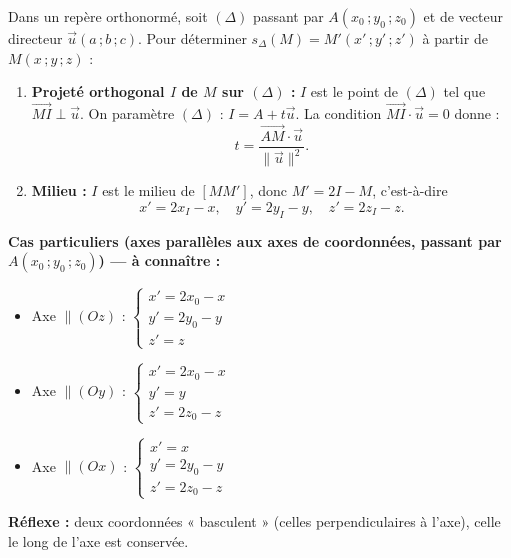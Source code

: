 \documentclass[11pt]{article}
\begin{document}
\begin{methode}
Dans un repère orthonormé, soit $(\Delta)$ passant par $A(x_{0}\,;y_{0}\,;z_{0})$ et de vecteur directeur $\vec{u}(a\,;b\,;c)$. Pour déterminer $s_{\Delta}(M)=M'(x'\,;y'\,;z')$ à partir de $M(x\,;y\,;z)$ :
\begin{enumerate}
\item \textbf{Projeté orthogonal $I$ de $M$ sur $(\Delta)$ :} $I$ est le point de $(\Delta)$ tel que $\overrightarrow{MI}\perp\vec{u}$.
On paramètre $(\Delta)$ : $I = A + t\vec{u}$. La condition $\overrightarrow{MI}\cdot\vec{u}=0$ donne :
\[t = \frac{\overrightarrow{AM}\cdot\vec{u}}{\|\vec{u}\|^{2}}.\]
\item \textbf{Milieu :} $I$ est le milieu de $[MM']$, donc $M' = 2I - M$, c'est-à-dire
\[x' = 2x_{I}-x,\quad y' = 2y_{I}-y,\quad z' = 2z_{I}-z.\]
\end{enumerate}
\textbf{Cas particuliers (axes parallèles aux axes de coordonnées, passant par $A(x_{0}\,;y_{0}\,;z_{0})$) — à connaître :}
\begin{itemize}
\item Axe $\parallel (Oz)$ : $\begin{cases}x'=2x_{0}-x\\ y'=2y_{0}-y\\ z'=z\end{cases}$
\item Axe $\parallel (Oy)$ : $\begin{cases}x'=2x_{0}-x\\ y'=y\\ z'=2z_{0}-z\end{cases}$
\item Axe $\parallel (Ox)$ : $\begin{cases}x'=x\\ y'=2y_{0}-y\\ z'=2z_{0}-z\end{cases}$
\end{itemize}
\textbf{Réflexe :} deux coordonnées « basculent » (celles perpendiculaires à l'axe), celle le long de l'axe est conservée.
\end{methode}
\end{document}
